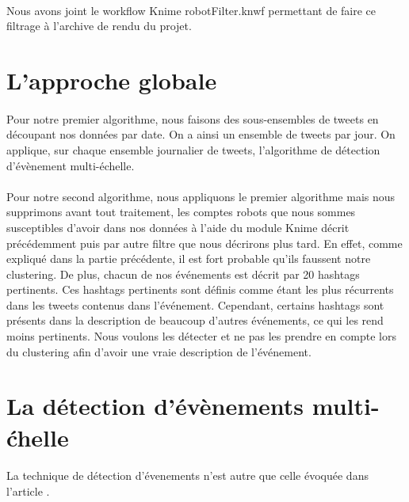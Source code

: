 \documentclass[12pt]{article}
\begin{document}
\paragraph{}
Nous avons joint le workflow Knime robotFilter.knwf permettant de faire ce filtrage \`a l'archive de rendu du projet.


\section{L'approche globale}

\paragraph{}
Pour notre premier algorithme, nous faisons des sous-ensembles de tweets en d\'ecoupant
nos donn\'ees par date. On a ainsi un ensemble de tweets par jour. On applique, sur chaque
ensemble journalier de tweets, l'algorithme de d\'etection d'\'ev\`enement multi-\'echelle.

\paragraph{}
Pour notre second algorithme, nous appliquons le premier algorithme mais nous supprimons avant tout traitement, les comptes robots
que nous sommes susceptibles d'avoir dans nos donn\'ees \`a l'aide du module Knime d\'ecrit pr\'ec\'edemment 
puis par autre filtre que nous d\'ecrirons plus tard. 
En effet, comme expliqu\'e dans la partie pr\'ec\'edente, il est fort probable qu'ils faussent notre clustering.
\newline
De plus, chacun de nos \'ev\'enements est d\'ecrit par 20 hashtags pertinents. Ces hashtags
pertinents sont d\'efinis comme \'etant les plus r\'ecurrents dans les tweets contenus dans
l'\'ev\'enement. Cependant, certains hashtags sont pr\'esents dans la description de
beaucoup d'autres \'ev\'enements, ce qui les rend moins pertinents. Nous voulons les
d\'etecter et ne pas les prendre en compte lors du clustering afin d'avoir une vraie description
de l'\'ev\'enement.

\newpage


\section{La d\'etection d'\'ev\`enements multi-\'chelle}

\paragraph{}
La technique de d\'etection d'\'evenements n'est autre que celle \'evoqu\'ee dans l'article \cite{Multievents}.
\end{document}
